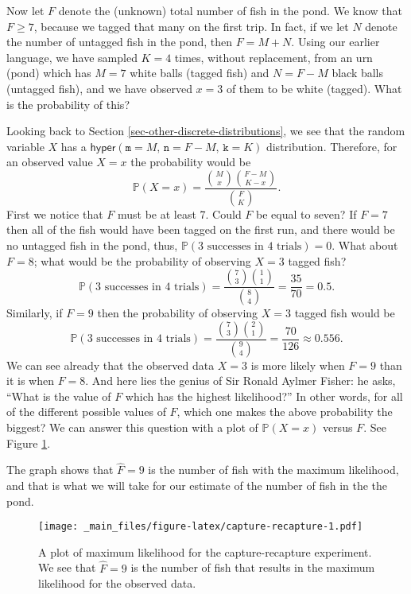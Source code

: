 \documentclass[]{book}
\numberwithin{equation}{chapter}
\numberwithin{figure}{chapter}
\theoremstyle{plain}
\theoremstyle{definition}
\theoremstyle{remark}
\theoremstyle{definition}
\theoremstyle{definition}
\theoremstyle{remark}
\begin{document}
Now let \(F\) denote the (unknown) total number of fish in the pond. We
know that \(F\geq7\), because we tagged that many on the first trip. In
fact, if we let \(N\) denote the number of untagged fish in the pond,
then \(F=M+N\). Using our earlier language, we have sampled \(K=4\)
times, without replacement, from an urn (pond) which has \(M=7\) white
balls (tagged fish) and \(N=F-M\) black balls (untagged fish), and we
have observed \(x=3\) of them to be white (tagged). What is the
probability of this?

Looking back to Section \ref{sec-other-discrete-distributions}, we see
that the random variable \(X\) has a
\(\mathsf{hyper}(\mathtt{m}=M,\,\mathtt{n}=F-M,\,\mathtt{k}=K)\)
distribution. Therefore, for an observed value \(X=x\) the probability
would be \[ \mathbb{P}(X=x)=\frac{{M \choose x}{F-M \choose K-x}}{{F
\choose K}}.  \] First we notice that \(F\) must be at least 7. Could
\(F\) be equal to seven? If \(F=7\) then all of the fish would have been
tagged on the first run, and there would be no untagged fish in the
pond, thus, \(\mathbb{P}(\mbox{3 successes in 4 trials})=0\). What about
\(F=8\); what would be the probability of observing \(X=3\) tagged fish?
\[ \mathbb{P}(\mbox{3 successes in 4 trials})=\frac{{7
\choose 3}{1 \choose 1}}{{8 \choose 4}}=\frac{35}{70}=0.5.  \]
Similarly, if \(F=9\) then the probability of observing \(X=3\) tagged
fish would be \[ \mathbb{P}(\mbox{3 successes in 4 trials})=\frac{{7
\choose 3}{2 \choose 1}}{{9 \choose 4}}=\frac{70}{126}\approx0.556.
\] We can see already that the observed data \(X=3\) is more likely when
\(F=9\) than it is when \(F=8\). And here lies the genius of Sir Ronald
Aylmer Fisher: he asks, ``What is the value of \(F\) which has the
highest likelihood?'' In other words, for all of the different possible
values of \(F\), which one makes the above probability the biggest? We
can answer this question with a plot of \(\mathbb{P}(X=x)\) versus
\(F\). See Figure \ref{fig:capture-recapture}.

The graph shows that \(\hat{F}=9\) is the number of fish with the
maximum likelihood, and that is what we will take for our estimate of
the number of fish in the the pond.

\begin{figure}[htbp]
\centering
\texttt{[image: \_main\_files/figure-latex/capture-recapture-1.pdf]}
\caption{\label{fig:capture-recapture}\small A plot of maximum likelihood for the
capture-recapture experiment. We see that \(\hat{F}=9\) is the number of
fish that results in the maximum likelihood for the observed data.}
\end{figure}
\end{document}
